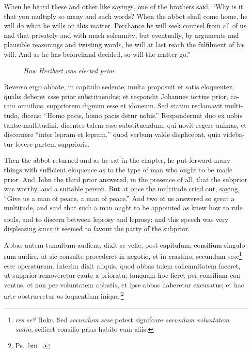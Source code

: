 \documentclass{book}
\newcounter{engnote}
\newcommand{\engnotenum}{\textsuperscript{\arabic{engnote}\stepcounter{engnote}}}
\newcommand{\engnotetext}[1]{\vphantom{\footnotemark{}}\footnotetext{#1}}
\newcommand{\blockhead}[4][]{
\begin{figure}
\centering
\vspace{#4}
\parbox{2.75cm}{\begin{center}\footnotesize \color{BrickRed} \emph{#2}\\ #1 \end{center}}
\end{figure}
}
\begin{document}
\begin{paracol}{2}
\switchcolumn

When he heard these and other like sayings, one of the brothers said, ``Why is it that you multiply so many and such words? When the abbot shall come home, he will do what he wills on this matter. Perchance he will seek counsel from all of us and that privately and with much solemnity; but eventually, by arguments and plausible reasonings and twisting words, he will at last reach the fulfilment of his will. And as he has beforehand decided, so will the matter go.''

\switchcolumn*

\begin{otherlanguage}{latin}
\blockhead{How Heribert was elected prior.}{3}{-.55cm}
Reverso ergo abbate, in capitulo sedente, multa proposuit et satis eloquenter, qualis deberet esse prior substituendus; et respondit Johannes tertius prior, coram omnibus, suppriorem dignum esse et idoneum. Sed statim reclamavit multitudo, dicens: ``Homo pacis, homo pacis detur nobis.'' Responderunt duo ex nobis tant\ae{} multitudini, dicentes talem esse substituendum, qui novit regere animas, et discernere ``inter lepram et lepram,''\engnotetext{Deut.\ xvii., \oldstylenums{8}.} quod verbum valde displicebat, quia videbatur fovere partem supprioris. 

\end{otherlanguage}

\switchcolumn

Then the abbot returned and as he sat in the chapter, he put forward many things with sufficient eloquence as to the type of man who ought to be made prior. And John the third prior answered, in the presence of all, that the subprior was worthy, and a suitable person. But at once the multitude cried out, saying, ``Give us a man of peace, a man of peace.'' And two of us answered so great a multitude, and said that such a man ought to be appointed as knew how to rule souls, and to discern between leprosy and leprosy;\engnotenum{} and this speech was very displeasing since it seemed to favour the party of the subprior.

\switchcolumn*

\begin{otherlanguage}{latin}
Abbas autem tumultum audiens, dixit se velle, post capitulum, consilium singulorum audire, ut sic consulte procederet in negotio, et in crastino, secundum sese\footnote[\textdagger]{\emph{res se?} Roke. Sed \emph{secundum sese} potest signifcare \emph{secundum voluntatem suam,} scilicet consilio prius habito cum aliis.}  esse operaturum. Interim dixit aliquis, quod abbas talem sollemnitatem faceret, ut supprior removeretur caute a prioratu; tanquam hoc fieret per consilium conventus, et non per voluntatem abbatis, et ipse abbas haberetur excusatus; et hac arte obstrueretur os loquentium iniqua.\footnote[\ddag]{Ps.\ lxii.\ .}
\end{otherlanguage}


\end{paracol}
\end{document}
